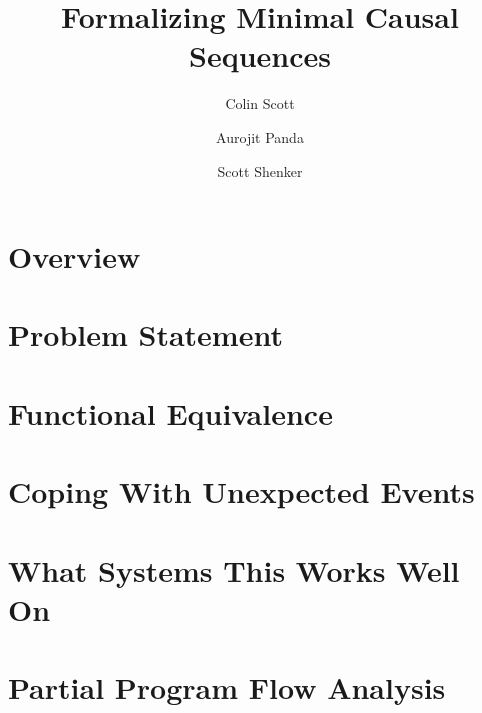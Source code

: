 \documentclass{article}
\begin{document}
\title{Formalizing Minimal Causal Sequences}

\author{Colin Scott \and Aurojit Panda \and Scott Shenker}
   \date{}
   \maketitle
   \thispagestyle{empty}

\section{Overview}
\label{sec:intro}


\section{Problem Statement}
\label{sec:problem_statement}


\section{Functional Equivalence}
\label{sec:functional_equivs}


\section{Coping With Unexpected Events}
\label{sec:unexpected}


\section{What Systems This Works Well On}
\label{sec:systems}


\section{Partial Program Flow Analysis}
\label{sec:program_flow}


\renewcommand{\baselinestretch}{0.97}


%
\end{document}
